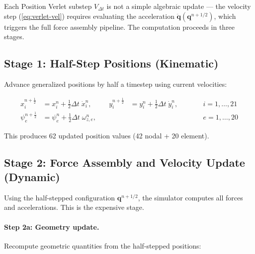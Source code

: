\documentclass[11pt]{article}
\newcommand{\vect}[1]{\mathbf{#1}}
\begin{document}
Each Position Verlet substep $V_{\Delta t}$ is not a simple algebraic update --- the velocity step (\ref{eq:verlet-vel}) requires evaluating the acceleration $\ddot{\vect{q}}(\vect{q}^{n+1/2})$, which triggers the full force assembly pipeline.
The computation proceeds in three stages.

\subsection{Stage 1: Half-Step Positions (Kinematic)}
\label{sec:stage1}

Advance generalized positions by half a timestep using current velocities:

\begin{subequations}
\label{eq:stage1}
\begin{alignat}{3}
  x_i^{n+\frac{1}{2}} &= x_i^n + \tfrac{1}{2}\Delta t\;\dot{x}_i^n,
  &\quad
  y_i^{n+\frac{1}{2}} &= y_i^n + \tfrac{1}{2}\Delta t\;\dot{y}_i^n,
  &\qquad& i = 1, \ldots, 21
  \label{eq:stage1-pos} \\[4pt]
  \psi_e^{n+\frac{1}{2}} &= \psi_e^n + \tfrac{1}{2}\Delta t\;\omega_{z,e}^n,
  &&
  &\qquad& e = 1, \ldots, 20
  \label{eq:stage1-yaw}
\end{alignat}
\end{subequations}

\noindent
This produces 62 updated position values (42 nodal + 20 element).

\subsection{Stage 2: Force Assembly and Velocity Update (Dynamic)}
\label{sec:stage2}

Using the half-stepped configuration $\vect{q}^{n+1/2}$, the simulator computes all forces and accelerations.
This is the expensive stage.

\paragraph{Step 2a: Geometry update.}
Recompute geometric quantities from the half-stepped positions:
\end{document}
